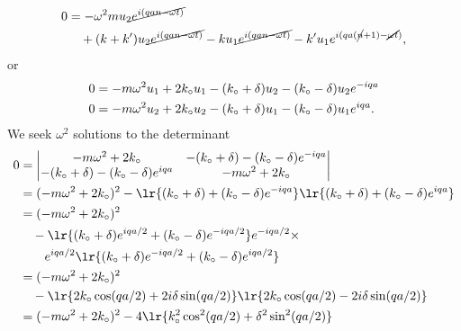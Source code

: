{\begin{equation}
\begin{aligned}
0 &= -\omega^2 m
u_2 \cancel{e^{ i(q a n - \omega t) } } \\
&\quad +
( k + k')
u_2 \cancel{e^{ i(q a n - \omega t) } }
- k
u_1 \cancel{e^{ i(q a n - \omega t) } }
- k'
u_1 e^{ i(q a (\cancel{n} + 1) - \cancel{\omega t}) },
\end{aligned}
\end{equation}
%
or
\begin{equation}\label{eqn:condensedMatterProblemSet4Problem2:340}
\begin{aligned}
0 &= -m \omega^2
u_1
+
2 k_\circ
u_1
- (k_\circ + \delta)
u_2
- (k_\circ - \delta)
u_2 e^{ -i q a } \\
0 &= -m \omega^2
u_2
+
2 k_\circ
u_2
- (k_\circ + \delta)
u_1
- (k_\circ - \delta)
u_1 e^{ i q a }.
\end{aligned}
\end{equation}
%
We seek \(\omega^2\) solutions to the determinant
%
\begin{equation}\label{eqn:condensedMatterProblemSet4Problem2:380}
\begin{aligned}
0 &=
\begin{vmatrix}
-m \omega^2 + 2 k_\nought &
- (k_\nought + \delta)
- (k_\nought - \delta) e^{ -i q a }
\\
- (k_\nought + \delta)
- (k_\nought - \delta) e^{ i q a }
&
-m \omega^2 + 2 k_\nought
\end{vmatrix} \\
&=
(-m \omega^2 + 2 k_\nought )^2
-
\lr{
  (k_\nought + \delta)
+ (k_\nought - \delta) e^{ -i q a }
}
\lr{
  (k_\nought + \delta)
+ (k_\nought - \delta) e^{ i q a }
} \\
&=
(-m \omega^2 + 2 k_\nought )^2 \\
&\quad -
\lr{
  (k_\nought + \delta)
e^{ i q a/2 }
+ (k_\nought - \delta)
e^{ -i q a/2 }
}
e^{ -i q a/2 } \times \\
&\qquad
e^{ i q a/2 }
\lr{
  (k_\nought + \delta) e^{ -i q a/2 }
+ (k_\nought - \delta) e^{ i q a/2 }
} \\
&=
(-m \omega^2 + 2 k_\nought )^2 \\
&\quad -
\lr{
  2 k_\nought \cos (qa/2)
+ 2i \delta \sin (qa/2)
}
\lr{
  2 k_\nought \cos (qa/2)
- 2i \delta \sin (qa/2)
} \\
&=
(-m \omega^2 + 2 k_\nought )^2
-
4 \lr{
  k_\nought^2 \cos^2 (qa/2)
+ \delta^2 \sin^2 (qa/2)
}
\end{aligned}
\end{equation}
%
}
